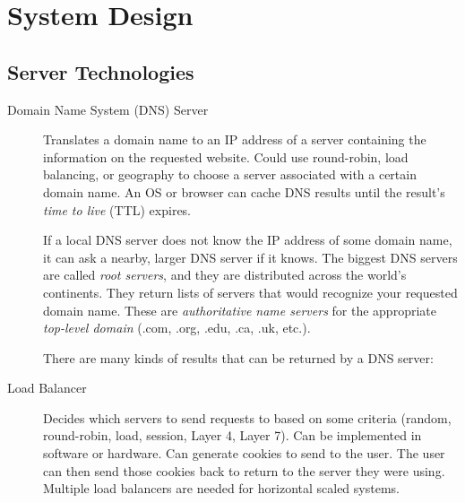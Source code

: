 \chapter{System Design}


\section{Server Technologies}

\begin{description}
    \item[Domain Name System (DNS) Server] Translates a domain name to an IP address of a server containing the information on the requested website. Could use round-robin, load balancing, or geography to choose a server associated with a certain domain name. An OS or browser can cache DNS results until the result's \textit{time to live} (TTL) expires.
	
    If a local DNS server does not know the IP address of some domain name, it can ask a nearby, larger DNS server if it knows. The biggest DNS servers are called \textit{root servers}, and they are distributed across the world's continents. They return lists of servers that would recognize your requested domain name. These are \textit{authoritative name servers} for the appropriate \textit{top-level domain} (.com, .org, .edu, .ca, .uk, etc.).
		
    There are many kinds of results that can be returned by a DNS server:

    \vspace{4mm}
    \vspace{4mm}
	
    \item[Load Balancer] Decides which servers to send requests to based on some criteria (random, round-robin, load, session, Layer 4, Layer 7). Can be implemented in software or hardware. Can generate cookies to send to the user. The user can then send those cookies back to return to the server they were using. Multiple load balancers are needed for horizontal scaled systems.
		

\end{description}
